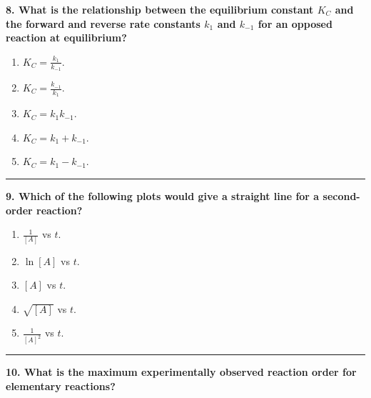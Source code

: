 \documentclass[
  9pt,
]{extbook}
\providecommand{\tightlist}{%
  \setlength{\itemsep}{0pt}\setlength{\parskip}{0pt}}
\theoremstyle{definition}
\theoremstyle{definition}
\theoremstyle{definition}
\theoremstyle{definition}
\theoremstyle{remark}
\begin{document}
\textbf{8. What is the relationship between the equilibrium constant \(K_C\) and the forward and reverse rate constants \(k_1\) and \(k_{-1}\) for an opposed reaction at equilibrium?}

\begin{enumerate}
\def\labelenumi{\alph{enumi}.}
\tightlist
\item
  \(K_C = \frac{k_1}{k_{-1}}\).
\item
  \(K_C = \frac{k_{-1}}{k_1}\).
\item
  \(K_C = k_1 k_{-1}\).
\item
  \(K_C = k_1 + k_{-1}\).
\item
  \(K_C = k_1 - k_{-1}\).
\end{enumerate}

\begin{center}\rule{0.5\linewidth}{0.5pt}\end{center}

\textbf{9. Which of the following plots would give a straight line for a second-order reaction?}

\begin{enumerate}
\def\labelenumi{\alph{enumi}.}
\tightlist
\item
  \(\frac{1}{[A]}\) vs \(t\).
\item
  \(\ln[A]\) vs \(t\).
\item
  \([A]\) vs \(t\).
\item
  \(\sqrt{[A]}\) vs \(t\).
\item
  \(\frac{1}{[A]^2}\) vs \(t\).
\end{enumerate}

\begin{center}\rule{0.5\linewidth}{0.5pt}\end{center}

\textbf{10. What is the maximum experimentally observed reaction order for elementary reactions?}
\end{document}
